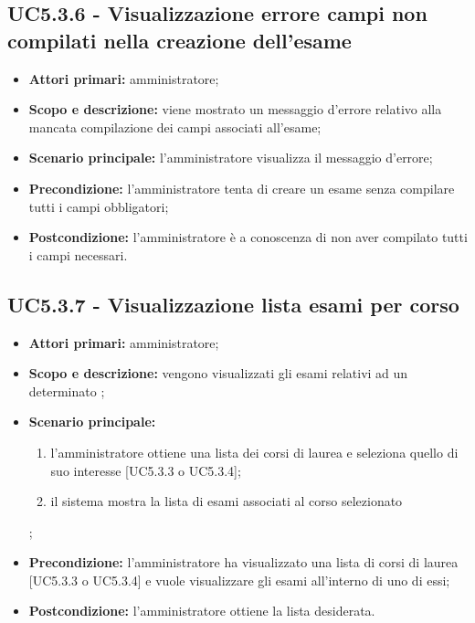 \documentclass[AnalisiDeiRequisiti.tex]{subfiles}
\begin{document}
\subsection{UC5.3.6 - Visualizzazione errore campi non compilati nella creazione dell'esame}
\begin{itemize}
	\item \textbf{Attori primari:} amministratore;
	\item \textbf{Scopo e descrizione:} viene mostrato un messaggio d'errore relativo alla mancata compilazione dei campi associati all'esame;
	\item \textbf{Scenario principale:} l'amministratore visualizza il messaggio d'errore;
	\item \textbf{Precondizione:} l'amministratore tenta di creare un esame senza compilare tutti i campi obbligatori; 
	\item \textbf{Postcondizione:} l'amministratore è a conoscenza di non aver compilato tutti i campi necessari.
\end{itemize}
\subsection{UC5.3.7 - Visualizzazione lista esami per corso}
\begin{itemize}
	\item \textbf{Attori primari:} amministratore;
	\item \textbf{Scopo e descrizione:} vengono visualizzati gli esami relativi ad un determinato ;
	\item \textbf{Scenario principale:}
	\begin{enumerate}
		\item l'amministratore ottiene una lista dei corsi di laurea e seleziona quello di suo interesse [UC5.3.3 o UC5.3.4];
		\item il sistema mostra la lista di esami associati al corso selezionato
	\end{enumerate};
	\item \textbf{Precondizione:} l'amministratore ha visualizzato una lista di corsi di laurea [UC5.3.3 o UC5.3.4] e vuole visualizzare gli esami all'interno di uno di essi; 
	\item \textbf{Postcondizione:} l'amministratore ottiene la lista desiderata.
\end{itemize}
\end{document}
